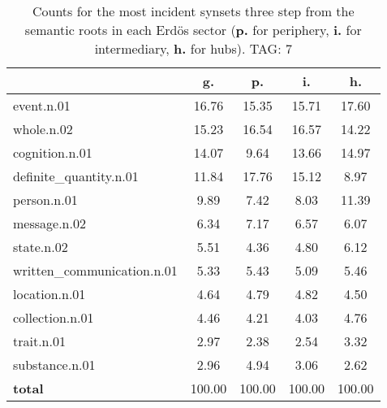 \begin{table}[h!]
\begin{center}
\begin{tabular}{| l || c | c | c | c |}\hline
 & {\bf g.} & {\bf p.} & {\bf i.} & {\bf h.} \\\hline\hline
event.n.01 & 16.76  & 15.35  & 15.71  & 17.60 \\\hline
whole.n.02 & 15.23  & 16.54  & 16.57  & 14.22 \\\hline
cognition.n.01 & 14.07  & 9.64  & 13.66  & 14.97 \\\hline
definite\_quantity.n.01 & 11.84  & 17.76  & 15.12  & 8.97 \\\hline
person.n.01 & 9.89  & 7.42  & 8.03  & 11.39 \\\hline
message.n.02 & 6.34  & 7.17  & 6.57  & 6.07 \\\hline
state.n.02 & 5.51  & 4.36  & 4.80  & 6.12 \\\hline
written\_communication.n.01 & 5.33  & 5.43  & 5.09  & 5.46 \\\hline
location.n.01 & 4.64  & 4.79  & 4.82  & 4.50 \\\hline
collection.n.01 & 4.46  & 4.21  & 4.03  & 4.76 \\\hline
trait.n.01 & 2.97  & 2.38  & 2.54  & 3.32 \\\hline
substance.n.01 & 2.96  & 4.94  & 3.06  & 2.62 \\\hline\hline
{{\bf total}} & 100.00  & 100.00  & 100.00  & 100.00 \\\hline
\end{tabular}
\caption{Counts for the most incident synsets three step from the semantic roots in each Erd\"os sector ({\bf p.} for periphery, {\bf i.} for intermediary, {\bf h.} for hubs). TAG: 7}
\end{center}
\end{table}